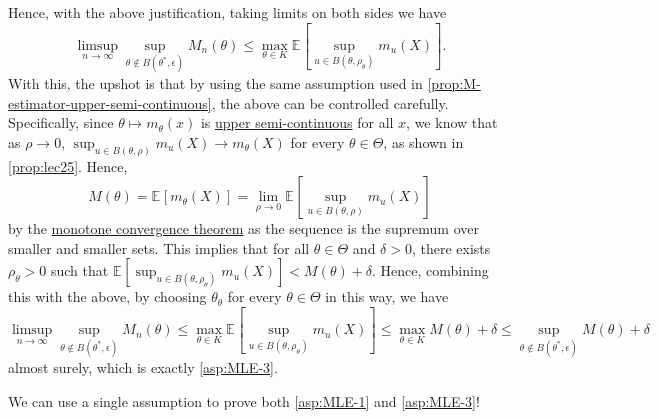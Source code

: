 Hence, with the above justification, taking limits on both sides we have
\[
	\limsup_{n \to \infty} \sup _{\theta \notin B(\theta ^{\ast} , \epsilon )} M_n(\theta )
	\leq \max _{\theta \in K} \mathbb{E}_{}\left[\sup _{u \in B(\theta , \rho _\theta )} m_u(X)\right] .
\]
With this, the upshot is that by using the same assumption used in \autoref{prop:M-estimator-upper-semi-continuous}, the above can be controlled carefully. Specifically, since \(\theta \mapsto m_\theta (x)\) is \hyperref[def:upper-semi-continuous]{upper semi-continuous} for all \(x\), we know that as \(\rho \to 0\), \(\sup _{u\in B(\theta , \rho )}m_u(X) \to m_\theta (X)\) for every \(\theta \in \Theta \), as shown in \autoref{prop:lec25}. Hence,
\[
	M(\theta )
	= \mathbb{E}_{}[m_\theta (X)]
	= \lim_{\rho \to 0} \mathbb{E}_{}\left[\sup _{u \in B(\theta , \rho )} m_u(X) \right]
\]
by the \href{https://en.wikipedia.org/wiki/Monotone_convergence_theorem}{monotone convergence theorem} as the sequence is the supremum over smaller and smaller sets. This implies that for all \(\theta \in \Theta \) and \(\delta > 0\), there exists \(\rho _\theta > 0\) such that \(\mathbb{E}_{}[\sup _{u \in B(\theta , \rho _\theta )} m_u(X)] < M(\theta ) + \delta \). Hence, combining this with the above, by choosing \(\theta _{\theta }\) for every \(\theta \in \Theta \) in this way, we have
\[
	\limsup_{n \to \infty} \sup _{\theta \notin B(\theta ^{\ast} , \epsilon )} M_n(\theta )
	\leq \max _{\theta \in K} \mathbb{E}_{}\left[\sup _{u \in B(\theta , \rho _\theta )} m_u(X)\right]
	\leq \max _{\theta \in K} M(\theta ) + \delta
	\leq \sup _{\theta \notin B(\theta ^{\ast} , \epsilon )}M(\theta ) + \delta
\]
almost surely, which is exactly \autoref{asp:MLE-3}.

\begin{intuition}
	We can use a single assumption to prove both \autoref{asp:MLE-1} and \autoref{asp:MLE-3}!
\end{intuition}